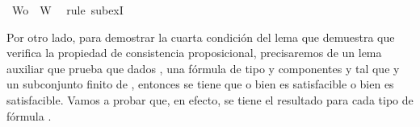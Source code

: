 \begin{isabellebody}
\ {\isacartoucheopen}Wo{\isacharprime}\ {\isasymsubseteq}\ W{\isacartoucheclose}\ \isamarkupfalse%
\ {\isacharparenleft}rule\ subexI{\isacharparenright}\isanewline
\ \ \isamarkupfalse%
\isanewline
{}\isamarkupfalse%
%
\endisatagproof
{\isafoldproof}%
%
\isadelimproof
%
\endisadelimproof
%
\begin{isamarkuptext}%
Por otro lado, para demostrar la cuarta condición del lema  que demuestra que  
  verifica la propiedad de consistencia proposicional, precisaremos de un lema auxiliar que prueba 
  que dados ,  una fórmula de tipo \isa{{\isasymbeta}} y componentes  y  tal que  y  un 
  subconjunto finito de , entonces se tiene que o bien  es satisfacible o bien 
   es satisfacible. Vamos a probar que, en efecto, se tiene el resultado para cada tipo de fórmula \isa{{\isasymbeta}}.


\end{isamarkuptext}
\end{isabellebody}
